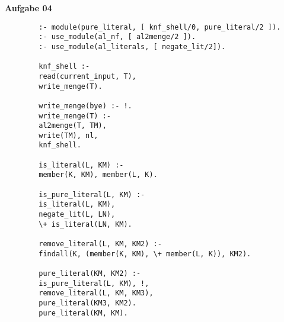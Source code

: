 \documentclass[a4paper,10pt]{article}
\begin{document}
	\textbf{Aufgabe 04}\\
	\begin{verbatim}
		:- module(pure_literal, [ knf_shell/0, pure_literal/2 ]).
		:- use_module(al_nf, [ al2menge/2 ]).
		:- use_module(al_literals, [ negate_lit/2]).
		
		knf_shell :-
		read(current_input, T),
		write_menge(T).
		
		write_menge(bye) :- !.
		write_menge(T) :-
		al2menge(T, TM),
		write(TM), nl,
		knf_shell.
		
		is_literal(L, KM) :-
		member(K, KM), member(L, K).
		
		is_pure_literal(L, KM) :-
		is_literal(L, KM),
		negate_lit(L, LN),
		\+ is_literal(LN, KM).
		
		remove_literal(L, KM, KM2) :-
		findall(K, (member(K, KM), \+ member(L, K)), KM2).
		
		pure_literal(KM, KM2) :-
		is_pure_literal(L, KM), !,
		remove_literal(L, KM, KM3),
		pure_literal(KM3, KM2).
		pure_literal(KM, KM).
	\end{verbatim}
\end{document}
